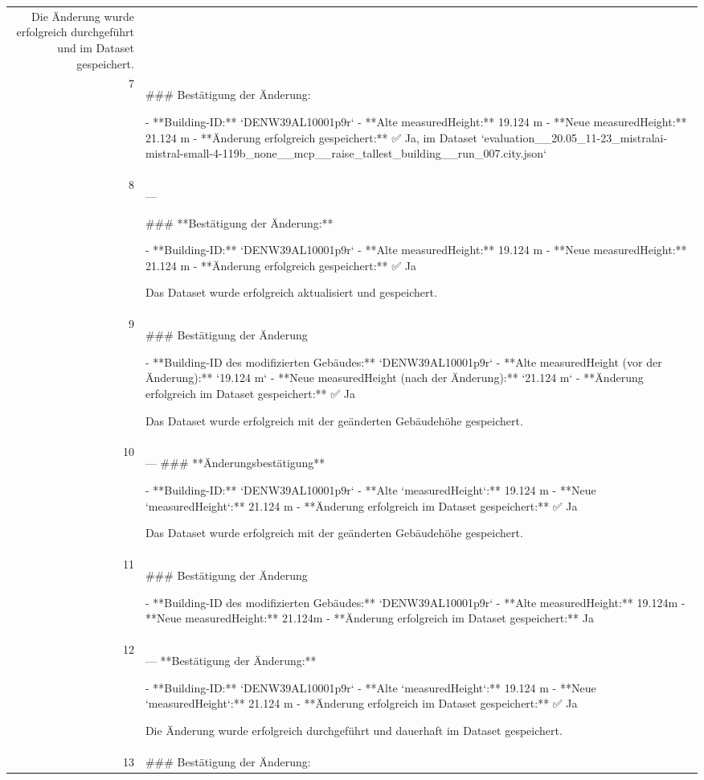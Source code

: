 \documentclass[a4paper,11pt]{article}
\begin{document}
\begin{table}[ht]
\begin{tabular}{r p{12cm}}
Die Änderung wurde erfolgreich durchgeführt und im Dataset gespeichert. \\
7 & \#\#\# Bestätigung der Änderung:

- **Building-ID:** `DENW39AL10001p9r`
- **Alte measuredHeight:** 19.124 m
- **Neue measuredHeight:** 21.124 m
- **Änderung erfolgreich gespeichert:** ✅ Ja, im Dataset `evaluation\_\_20.05\_11-23\_mistralai-mistral-small-4-119b\_none\_\_mcp\_\_raise\_tallest\_building\_\_run\_007.city.json` \\
8 & ---

\#\#\# **Bestätigung der Änderung:**

- **Building-ID:** `DENW39AL10001p9r`
- **Alte measuredHeight:** 19.124 m
- **Neue measuredHeight:** 21.124 m
- **Änderung erfolgreich gespeichert:** ✅ Ja

Das Dataset wurde erfolgreich aktualisiert und gespeichert. \\
9 & \#\#\# Bestätigung der Änderung

- **Building-ID des modifizierten Gebäudes:** `DENW39AL10001p9r`
- **Alte measuredHeight (vor der Änderung):** `19.124 m`
- **Neue measuredHeight (nach der Änderung):** `21.124 m`
- **Änderung erfolgreich im Dataset gespeichert:** ✅ Ja

Das Dataset wurde erfolgreich mit der geänderten Gebäudehöhe gespeichert. \\
10 & ---
\#\#\# **Änderungsbestätigung**

- **Building-ID:** `DENW39AL10001p9r`
- **Alte `measuredHeight`:** 19.124 m
- **Neue `measuredHeight`:** 21.124 m
- **Änderung erfolgreich im Dataset gespeichert:** ✅ Ja

Das Dataset wurde erfolgreich mit der geänderten Gebäudehöhe gespeichert. \\
11 & \#\#\# Bestätigung der Änderung

- **Building-ID des modifizierten Gebäudes:** `DENW39AL10001p9r`
- **Alte measuredHeight:** 19.124m
- **Neue measuredHeight:** 21.124m
- **Änderung erfolgreich im Dataset gespeichert:** Ja \\
12 & ---
**Bestätigung der Änderung:**

- **Building-ID:** `DENW39AL10001p9r`
- **Alte `measuredHeight`:** 19.124 m
- **Neue `measuredHeight`:** 21.124 m
- **Änderung erfolgreich im Dataset gespeichert:** ✅ Ja

Die Änderung wurde erfolgreich durchgeführt und dauerhaft im Dataset gespeichert. \\
13 & \#\#\# Bestätigung der Änderung:


\end{tabular}
\end{table}
\end{document}

